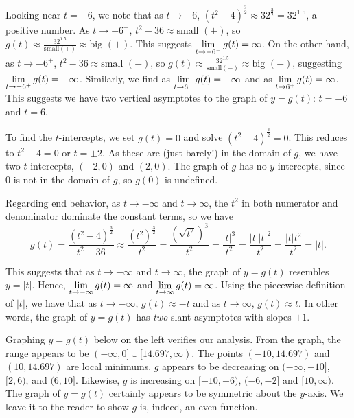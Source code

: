 \documentclass{ximera}
\begin{document}
\begin{ex}
\begin{enumerate}
Looking near $t = -6$, we note that as $t \rightarrow -6$, $(t^2-4)^{\frac{3}{2}} \approx 32^{\frac{3}{2}} = 32^{1.5}$, a positive number.  As $t \rightarrow -6^{-}$, $t^2-36 \approx \text{small $(+)$}$, so $g(t) \approx \frac{32^{1.5}}{\text{small$(+)$}} \approx \text{big $(+)$}$.  This suggests $\ds{\lim_{t \rightarrow -6^{-}} g(t) =\infty}$.  On the other hand, as $t \rightarrow -6^{+}$, $t^2 -36 \approx \text{small $(-)$}$, so $g(t) \approx \frac{32^{1.5}}{\text{small$(-)$}} \approx \text{big $(-)$}$, suggesting$\ds{\lim_{t \rightarrow -6^{+}} g(t) = -\infty}$. Similarly, we find as  $\ds{\lim_{t \rightarrow 6^{-}} g(t) = -\infty}$ and as  $\ds{\lim_{t \rightarrow 6^{+}} g(t) = \infty}$.  This suggests we have two vertical asymptotes to the graph of $y = g(t)$:  $t = -6$ and $t = 6$.

To find the $t$-intercepts, we set $g(t) = 0$ and solve $(t^2-4)^{\frac{3}{2}} = 0$. This reduces to $t^2-4 =0$ or $t = \pm 2$.  As these are (just barely!) in the domain of $g$, we have two $t$-intercepts, $(-2,0)$ and $(2,0)$.  The graph of $g$ has no $y$-intercepts, since $0$ is not in the domain of $g$, so $g(0)$ is undefined.

Regarding end behavior, as $t \rightarrow  -\infty$ and $t \rightarrow  \infty$, the $t^2$ in both numerator and denominator dominate the constant terms, so we have \[ g(t) =  \dfrac{ (t^2-4)^{\frac{3}{2}} }{t^2-36} \approx  \dfrac{\left(t^2\right)^{\frac{3}{2}}}{t^2} = \dfrac{\left(\sqrt{t^2} \right)^3}{t^2} = \dfrac{|t|^3}{t^2} = \dfrac{|t| |t|^2}{t^2} = \dfrac{|t| t^2}{t^2} = |t|. \]


This suggests that as $t \rightarrow -\infty$ and $t \rightarrow  \infty$, the graph of $y = g(t)$ resembles $y = |t|$.  Hence, $\ds{\lim_{t \rightarrow   -\infty} g(t) = \infty}$ and $\ds{\lim_{t \rightarrow   \infty} g(t) = \infty}$.  Using the piecewise definition of $|t|$, we have that as $t \rightarrow -\infty$, $g(t) \approx -t$ and as $t \rightarrow \infty$, $g(t) \approx t$.  In other words, the graph of  $y = g(t)$ has \textit{two} slant asymptotes with slopes $\pm 1$. 

Graphing $y=g(t)$ below on the left verifies our analysis.  From the graph, the range appears to be $(-\infty, 0] \cup [14.697, \infty)$.  The points $(-10, 14.697)$ and $(10, 14.697)$ are local minimums.  $g$ appears to be decreasing on  $(-\infty, -10]$, $[2, 6)$, and $(6, 10]$. Likewise, $g$ is increasing on $[-10, -6)$, $(-6, -2]$ and $[10, \infty)$.  The graph of $y=g(t)$ certainly appears to be symmetric about the $y$-axis.  We leave it to the reader to show $g$ is, indeed, an even function.


\end{enumerate}
\end{ex}
\end{document}
